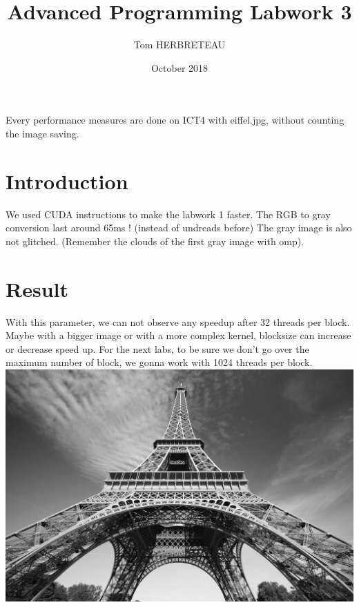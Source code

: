 \documentclass{article}
\title{Advanced Programming Labwork 3}
\author{Tom HERBRETEAU }
\date{October 2018}
\begin{document}
\maketitle
Every performance measures are done on ICT4 with eiffel.jpg, without counting the image saving.
\section{Introduction}
We used CUDA instructions to make the labwork 1 faster. The RGB to gray conversion last around 65ms ! (instead of undreads before)
The gray image is also not glitched. (Remember the clouds of the first gray image with omp).
\section{Result}
\newline
With this parameter, we can not observe any speedup after 32 threads per block. Maybe with a bigger image or with a more complex kernel, blocksize can increase or decrease speed up. For the next labs, to be sure we don't go over the maximum number of block, we gonna work with 1024 threads per block.
\newline
\includegraphics[width=\textwidth]{labwork3-gpu-out.jpg}

\end{document}
